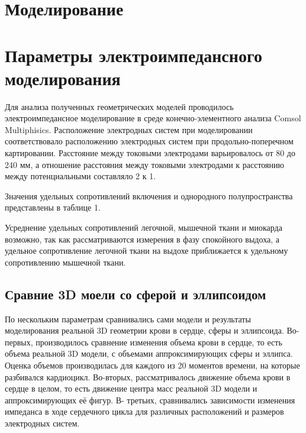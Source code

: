 \documentclass[conference]{IEEEtran}
\begin{document}
\section{Моделирование}
\section{Параметры электроимпедансного моделирования}
Для анализа полученных геометрических моделей проводилось электроимпедансное моделирование в среде конечно-элементного анализа Comsol Multiphisics.
Расположение электродных систем при моделировании соответствовало расположению электродных систем при продольно-поперечном картировании. Расстояние между токовыми электродами варьировалось от 80 до 240 мм, а отношение расстояния между токовыми электродами к расстоянию между потенциальными составляло 2 к 1.

Значения удельных сопротивлений включения и однородного полупространства представлены в таблице 1.


Усреднение удельных сопротивлений легочной, мышечной ткани и миокарда возможно, так как рассматриваются измерения в фазу спокойного выдоха, а удельное сопротивление легочной ткани на выдохе приближается к удельному сопротивлению мышечной ткани.

\subsection{Сравние 3D моели со сферой и эллипсоидом}

По нескольким параметрам сравнивались сами модели и результаты моделирования реальной 3D геометрии крови в сердце, сферы и эллипсоида.
Во-первых, производилось сравнение изменения объема крови в сердце, то есть объема реальной 3D модели, с объемами аппроксимирующих сферы и эллипса. Оценка объемов производилась для каждого из 20 моментов времени, на которые разбивался кардиоцикл.
Во-вторых, рассматривалось движение объема крови в сердце в целом, то есть движение центра масс реальной 3D модели и аппроксимирующих её фигур.
В- третьих, сравнивались зависимости изменения импеданса в ходе сердечного цикла для различных расположений и размеров электродных систем.
\end{document}
